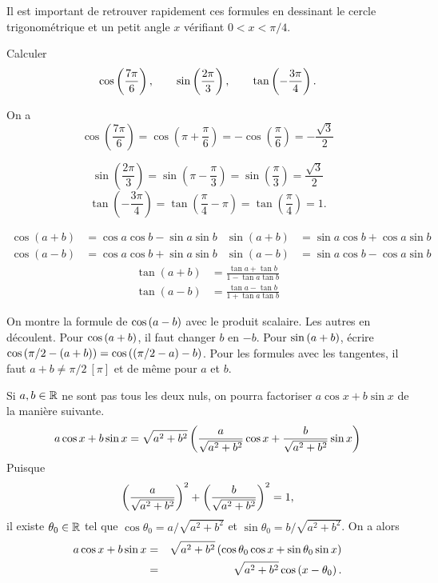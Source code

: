 \documentclass{magnolia}
\begin{document}
\begin{remarqueUnique}
\remarque Il est important de retrouver rapidement ces formules en dessinant le cercle trigonométrique et un \og petit \fg angle $x$ vérifiant $0<x<\pi/4$.
\end{remarqueUnique}

\begin{exoUnique}
\exo Calculer
  \[\cos\left(\frac{7\pi}{6}\right), \qquad \sin\left(\frac{2\pi}{3}\right), \qquad
    \tan\left(-\frac{3\pi}{4}\right).\]
  \begin{sol}
  On a
\[\cos\left( \frac{7\pi}{6} \right)=\cos\left( \pi+\frac{\pi}{6} \right)=-\cos\left( \frac{\pi}{6} \right)=-\frac{\sqrt{3}}{2}\]

\[\sin\left( \frac{2\pi}{3} \right)=\sin\left( \pi-\frac{\pi}{3} \right)=\sin\left( \frac{\pi}{3} \right)=\frac{\sqrt{3}}{2}\]
\[\tan\left( -\frac{3\pi}{4}\right) =\tan\left(\frac{\pi}{4}-\pi\right) =\tan\left(\frac{\pi}{4}\right) =1.\]
  \end{sol}
\end{exoUnique}

\begin{proposition}[nom={Addition des arcs}]
\begin{align*}
\cos(a+b)&=\cos a\cos b-\sin a\sin b &\sin(a+b)&=\sin a\cos b+\cos a\sin b\\
\cos(a-b)&=\cos a\cos b+\sin a\sin b &\sin(a-b)&=\sin a\cos b-\cos a\sin b
\end{align*}
\begin{align*}
\tan(a+b)&=\frac{\tan a+\tan b}{1-\tan a\tan b}\\
\tan(a-b)&=\frac{\tan a-\tan b}{1+\tan a\tan b}
\end{align*}
\end{proposition}
\begin{preuve}
On montre la formule de $\cos\left(a-b\right)$ avec le produit scalaire. Les autres en
découlent. Pour $\cos\left(a+b\right)$, il faut changer $b$ en $-b$. Pour
$\sin\left(a+b\right)$, écrire $\cos\left(\pi/2-\left(a+b\right)\right)=\cos\left(\left(\pi/2-a\right)-b\right)$.
Pour les formules avec les tangentes, il faut $a+b\neq \pi/2\ [\pi]$ et
de même pour $a$ et $b$. 
\end{preuve}

\begin{remarqueUnique}
\remarque Si $a,b\in\mathbb{R}$ ne sont pas tous les deux nuls, on pourra factoriser
  $a\cos x+b\sin x$ de la manière suivante.
  \[a\cos x+b\sin x=\sqrt{a^2+b^2}\left(\frac{a}{\sqrt{a^2+b^2}}\cos x+
                      \frac{b}{\sqrt{a^2+b^2}}\sin x\right)\]
  Puisque
  \[\left(\frac{a}{\sqrt{a^2+b^2}}\right)^2+\left(\frac{b}{\sqrt{a^2+b^2}}\right)^2=1,\]
  il existe $\theta_0\in\mathbb{R}$ tel que $\cos\theta_0=a/\sqrt{a^2+b^2}$ et
  $\sin\theta_0=b/\sqrt{a^2+b^2}$. On a alors
  \begin{eqnarray*}
  a\cos x+b\sin x &=& \sqrt{a^2+b^2}\left(\cos\theta_0\cos x+\sin\theta_0\sin x\right)\\
                  &=& \sqrt{a^2+b^2}\cos\left(x-\theta_0\right).
  \end{eqnarray*}
\end{remarqueUnique}
\end{document}
